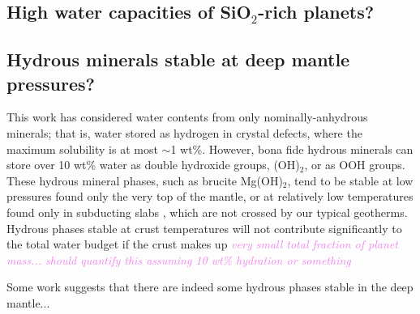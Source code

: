 \documentclass[linenumbers]{aastex631}
\newcommand{\todo}[1]{\textit{\textcolor{violet}{{#1}}}}
\begin{document}
\subsection{High water capacities of SiO$_2$-rich planets?}


\subsection{Hydrous minerals stable at deep mantle pressures?}

This work has considered water contents from only nominally-anhydrous minerals; that is, water stored as hydrogen in crystal defects, where the maximum solubility is at most $\sim$1 wt\%. However, bona fide hydrous minerals can store over 10 wt\% water as double hydroxide groups, (OH)$_2$, or as OOH groups. These hydrous mineral phases, such as brucite Mg(OH)$_2$, tend to be stable at low pressures found only the very top of the mantle, or at relatively low temperatures found only in subducting slabs \citep[e.g.,][]{hermann_high-pressure_2016}, which are not crossed by our typical geotherms. Hydrous phases stable at crust temperatures will not contribute significantly to the total water budget if the crust makes up \todo{very small total fraction of planet mass... should quantify this assuming 10 wt\% hydration or something}

Some work suggests that there are indeed some hydrous phases stable in the deep mantle... 






\end{document}

